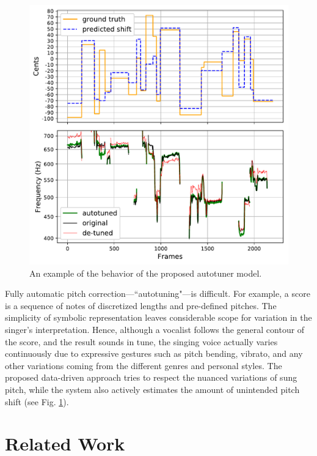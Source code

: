 \begin{figure}[t]
    \centering
    \includegraphics[width=\columnwidth]{figures/results.pdf}
    \caption{An example of the behavior of the proposed autotuner model.}
    \label{fig:results}
\end{figure}

Fully automatic pitch correction---``autotuning"---is difficult. For example, a score is a sequence of notes of discretized lengths and pre-defined pitches. The simplicity of symbolic representation leaves considerable scope for variation in the singer's interpretation. Hence, although a vocalist follows the general contour of the score, and the result sounds in tune, the singing voice actually varies continuously due to expressive gestures such as pitch bending, vibrato, and any other variations coming from the different genres and personal styles. The proposed data-driven approach tries to respect the nuanced variations of sung pitch, while the system also actively estimates the amount of unintended pitch shift (see Fig. \ref{fig:results}).

\section{Related Work}

